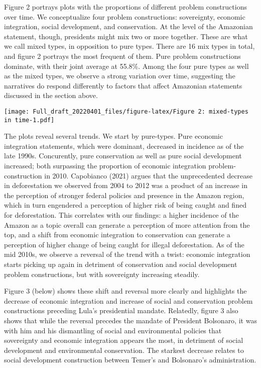 \documentclass[
]{article}
\begin{document}
Figure 2 portrays plots with the proportions of different problem
constructions over time. We conceptualize four problem constructions:
sovereignty, economic integration, social development, and conservation.
At the level of the Amazonian statement, though, presidents might mix
two or more together. These are what we call mixed types, in opposition
to pure types. There are 16 mix types in total, and figure 2 portrays
the most frequent of them. Pure problem constructions dominate, with
their joint average at 55.8\%. Among the four pure types as well as the
mixed types, we observe a strong variation over time, suggesting the
narratives do respond differently to factors that affect Amazonian
statements discussed in the section above.

\texttt{[image: Full\_draft\_20220401\_files/figure-latex/Figure 2: mixed-types in time-1.pdf]}

The plots reveal several trends. We start by pure-types. Pure economic
integration statements, which were dominant, decreased in incidence as
of the late 1990s. Concurently, pure conservation as well as pure social
development increased; both surpassing the proportion of economic
integration problem-construction in 2010. Capobianco (2021) argues that
the unprecedented decrease in deforestation we observed from 2004 to
2012 was a product of an increase in the perception of stronger federal
policies and presence in the Amazon region, which in turn engendered a
perception of higher risk of being caught and fined for deforestation.
This correlates with our findings: a higher incidence of the Amazon as a
topic overall can generate a perception of more attention from the top,
and a shift from economic integration to conservation can generate a
perception of higher change of being caught for illegal deforestation.
As of the mid 2010s, we observe a reversal of the trend with a twist:
economic integration starts picking up again in detriment of
conservation and social development problem constructions, but with
sovereignty increasing steadily.

Figure 3 (below) shows these shift and reversal more clearly and
highlights the decrease of economic integration and increase of social
and conservation problem constructions preceding Lula's presidential
mandate. Relatedly, figure 3 also shows that while the reversal precedes
the mandate of President Bolsonaro, it was with him and his dismantling
of social and environmental policies that sovereignty and economic
integration appears the most, in detriment of social development and
environmental conservation. The starkest decrease relates to social
development construction between Temer's and Bolsonaro's administration.
\end{document}
